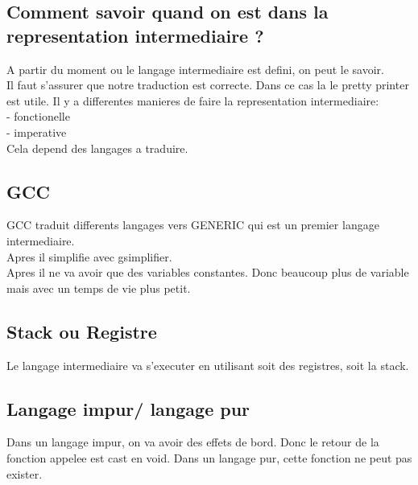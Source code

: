 \documentclass[a4paper,11pt]{article}
\begin{document}
\subsection{Comment savoir quand on est dans la representation intermediaire ?}
A  partir du moment ou le langage intermediaire est defini, on peut le savoir.\\
Il faut s'assurer que notre traduction est correcte. Dans ce cas la le pretty printer est utile.
Il y  a differentes manieres de faire la representation intermediaire:\\
- fonctionelle\\
- imperative\\

Cela depend des langages a traduire.

\subsection{GCC}\hfill \break
GCC traduit differents langages vers GENERIC qui est un premier langage intermediaire.\\
Apres il simplifie avec gsimplifier.\\
Apres il ne va avoir que des variables constantes. Donc beaucoup plus de variable mais avec un temps de vie plus petit.\\

\subsection{Stack ou Registre}
Le langage intermediaire va s'executer en utilisant soit des registres, soit la stack.

\subsection{Langage impur/ langage pur}
Dans un langage impur, on va avoir des effets de bord. Donc le retour de la fonction appelee est cast en void.
Dans un langage pur, cette fonction ne peut pas exister.
\end{document}
